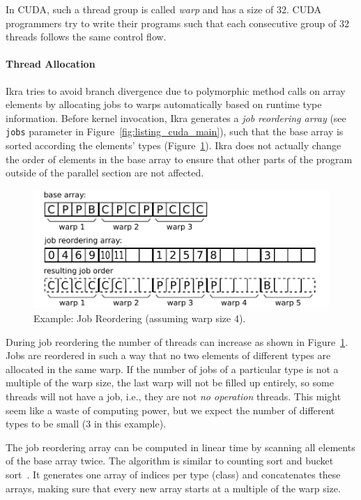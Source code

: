 \documentclass[preprint]{sigplanconf}
\begin{document}
In CUDA, such a thread group is called \emph{warp} and has a size of 32. CUDA programmers try to write their programs such that each consecutive group of 32 threads follows the same control flow.

\paragraph{Thread Allocation}
Ikra tries to avoid branch divergence due to polymorphic method calls on array elements by allocating jobs to warps automatically based on runtime type information. Before kernel invocation, Ikra generates a \emph{job reordering array} (see \texttt{jobs} parameter in Figure~\ref{fig:listing_cuda_main}), such that the base array is sorted according the elements' types (Figure~\ref{fig:ex_job_reorder}). Ikra does not actually change the order of elements in the base array to ensure that other parts of the program outside of the parallel section are not affected.

\begin{figure}[!htp]
    \centering
    \includegraphics[width=\columnwidth]{reorder_example.pdf}
    \caption{Example: Job Reordering (assuming warp size 4).}
    \label{fig:ex_job_reorder}
\end{figure}

During job reordering the number of threads can increase as shown in Figure~\ref{fig:ex_job_reorder}. Jobs are reordered in such a way that no two elements of different types are allocated in the same warp. If the number of jobs of a particular type is not a multiple of the warp size, the last warp will not be filled up entirely, so some threads will not have a job, i.e., they are not \emph{no operation} threads. This might seem like a waste of computing power, but we expect the number of different types to be small (3 in this example).

The job reordering array can be computed in linear time by scanning all elements of the base array twice. The algorithm is similar to counting sort and bucket sort~\cite{Corwin:2004:SLT:1040231.1040257}. It generates one array of indices per type (class) and concatenates these arrays, making sure that every new array starts at a multiple of the warp size. %
\end{document}
